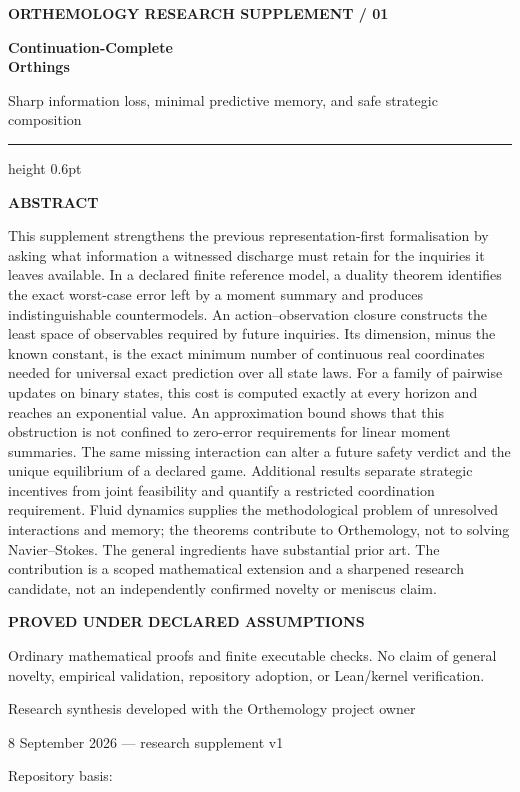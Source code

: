 \documentclass[11pt,a4paper]{article}
\begin{document}
\begin{titlepage}
\thispagestyle{empty}
\vspace*{5mm}
{\sffamily\small\bfseries\color{ink} ORTHEMOLOGY \hfill RESEARCH SUPPLEMENT / 01\par}
\vspace{15mm}
{\sffamily\fontsize{29}{34}\selectfont\bfseries\color{ink} Continuation-Complete\\[2pt]Orthings\par}
\vspace{6mm}
{\sffamily\large\color{softink} Sharp information loss, minimal
predictive memory, and safe strategic composition\par}
\vspace{10mm}
{\color{hairline}\hrule height 0.6pt}
\vspace{8mm}
{\sffamily\small\bfseries\color{ink} ABSTRACT\par}
\vspace{2mm}
This supplement strengthens the previous representation-first
formalisation by asking what information a witnessed discharge must
retain for the inquiries it leaves available. In a declared finite
reference model, a duality theorem identifies the exact worst-case error
left by a moment summary and produces indistinguishable countermodels.
An action--observation closure constructs the least space of observables
required by future inquiries. Its dimension, minus the known constant,
is the exact minimum number of continuous real coordinates needed for
universal exact prediction over all state laws. For a family of pairwise
updates on binary states, this cost is computed exactly at every horizon
and reaches an exponential value. An approximation bound shows that this
obstruction is not confined to zero-error requirements for linear moment
summaries. The same missing interaction can alter a future safety
verdict and the unique equilibrium of a declared game. Additional
results separate strategic incentives from joint feasibility and
quantify a restricted coordination requirement. Fluid dynamics supplies
the methodological problem of unresolved interactions and memory; the
theorems contribute to Orthemology, not to solving Navier--Stokes. The
general ingredients have substantial prior art. The contribution is a
scoped mathematical extension and a sharpened research candidate, not an
independently confirmed novelty or meniscus claim.
\vfill
{\sffamily\small\bfseries\color{ink} PROVED UNDER DECLARED ASSUMPTIONS\par}
{\small Ordinary mathematical proofs and finite executable checks. No claim of general novelty, empirical validation, repository adoption, or Lean/kernel verification.\par}
\vspace{6mm}
{\sffamily\small Research synthesis developed with the Orthemology
project owner\par}
{\sffamily\small\color{softink} 8 September 2026 --- research supplement
v1\par}
\vspace{4mm}
{\footnotesize Repository basis: \par}
\end{titlepage}
\end{document}
